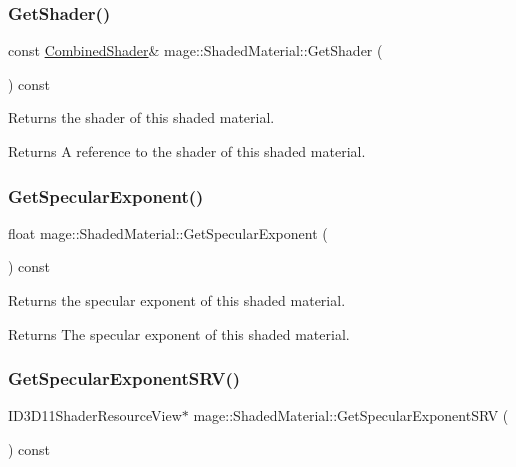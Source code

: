 \subsubsection{\texorpdfstring{Get\+Shader()}{GetShader()}}
{\footnotesize\ttfamily const \hyperlink{structmage_1_1_combined_shader}{Combined\+Shader}\& mage\+::\+Shaded\+Material\+::\+Get\+Shader (\begin{DoxyParamCaption}{ }\end{DoxyParamCaption}) const\hspace{0.3cm}{\ttfamily [noexcept]}}

Returns the shader of this shaded material.

\begin{DoxyReturn}{Returns}
A reference to the shader of this shaded material. 
\end{DoxyReturn}
\hypertarget{structmage_1_1_shaded_material_adb859615bf3461e9554e91550860d588}{}\label{structmage_1_1_shaded_material_adb859615bf3461e9554e91550860d588} 
\subsubsection{\texorpdfstring{Get\+Specular\+Exponent()}{GetSpecularExponent()}}
{\footnotesize\ttfamily float mage\+::\+Shaded\+Material\+::\+Get\+Specular\+Exponent (\begin{DoxyParamCaption}{ }\end{DoxyParamCaption}) const\hspace{0.3cm}{\ttfamily [noexcept]}}

Returns the specular exponent of this shaded material.

\begin{DoxyReturn}{Returns}
The specular exponent of this shaded material. 
\end{DoxyReturn}
\hypertarget{structmage_1_1_shaded_material_abae39d873aab545a59d1b611cf9b2025}{}\label{structmage_1_1_shaded_material_abae39d873aab545a59d1b611cf9b2025} 
\subsubsection{\texorpdfstring{Get\+Specular\+Exponent\+S\+R\+V()}{GetSpecularExponentSRV()}}
{\footnotesize\ttfamily I\+D3\+D11\+Shader\+Resource\+View$\ast$ mage\+::\+Shaded\+Material\+::\+Get\+Specular\+Exponent\+S\+RV (\begin{DoxyParamCaption}{ }\end{DoxyParamCaption}) const\hspace{0.3cm}{\ttfamily [noexcept]}}

